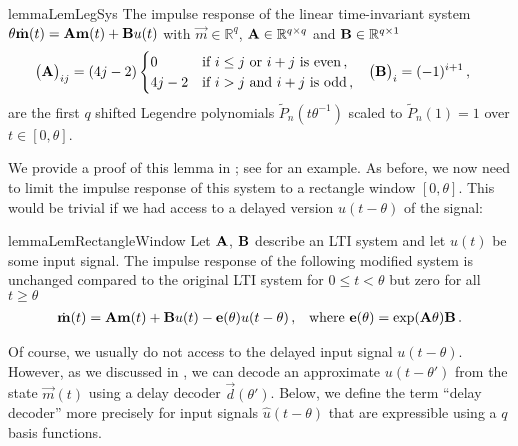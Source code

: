 \begin{restatable}{lemma}{LemLegSys}
The impulse response of the linear time-invariant system $\theta \dot{\mathbf{m}}(t) = {\mathbf{A}} \mathbf{m}(t) + {\mathbf{B}} u(t)$ with $\vec m \in \mathbb{R}^q$, ${\mathbf{A}} \in \mathbb{R}^{q \times q}$ and ${\mathbf{B}} \in \mathbb{R}^{q \times 1}$
\begin{align*}
	\begin{aligned}
	\big({\mathbf{A}}\big)_{ij} &= (4j - 2) \begin{cases}
			0 & \text{if } i \leq j \text{ or } i + j \text{ is even} \,, \\
			4j - 2 & \text{if } i > j \text{ and } i + j \text{ is odd} \,,
		\end{cases} &
	\big({\mathbf{B}}\big)_i &= (-1)^{i + 1} \,,
	\end{aligned}
\end{align*}
are the first $q$ shifted Legendre polynomials $\tilde P_n(t \theta^{-1})$ scaled to $\tilde P_n(1) = 1$ over $t \in [0, \theta]$.
\label{lem:leg_sys}
\end{restatable}
\noindent We provide a proof of this lemma in ; see  for an example.
As before, we now need to limit the impulse response of this system to a rectangle window $[0, \theta]$.
This would be trivial if we had access to a delayed version $u(t - \theta)$ of the signal:
\begin{restatable}{lemma}{LemRectangleWindow}
\label{lem:rectangle_window}
Let $\mathbf{A}$, $\mathbf{B}$ describe an LTI system and let $u(t)$ be some input signal.
The impulse response of the following modified system is unchanged compared to the original LTI system for $0 \leq t < \theta$ but zero for all $t \geq \theta$%
\begin{align*}
	\dot{\mathbf{m}}(t) &= \mathbf{A} \mathbf{m}(t) + \mathbf{B} u(t) - \mathbf{e}(\theta) u(t - \theta) \,, & \text{where } \mathbf{e}(\theta) = \exp(\mathbf{A} \theta) \mathbf{B} \,.
\end{align*}
\end{restatable}

Of course, we usually do not access to the delayed input signal $u(t - \theta)$.
However, as we discussed in , we can decode an approximate $u(t - \theta')$ from the state $\vec m(t)$ using a delay decoder $\vec d(\theta')$.
Below, we define the term \enquote{delay decoder} more precisely for input signals $\hat u(t - \theta)$ that are expressible using a $q$ basis functions.

